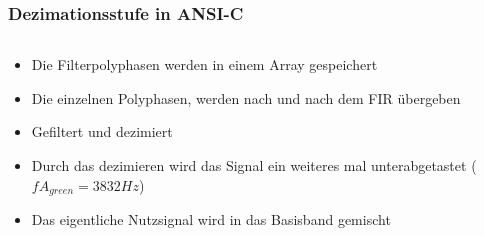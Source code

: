 \documentclass{beamer}
\begin{document}

\begin{frame}[fragile]
  \frametitle{Dezimationsstufe in ANSI-C}
  \begin{columns}
    \begin{column}{0.7\textwidth}
      \begin{itemize}
        \item Die Filterpolyphasen werden in einem Array gespeichert
        \item Die einzelnen Polyphasen, werden nach und nach dem FIR übergeben
        \item Gefiltert und dezimiert
        \item Durch das dezimieren wird das Signal ein weiteres mal unterabgetastet ($fA_{green} = 3832Hz$)
        \item Das eigentliche Nutzsignal wird in das Basisband gemischt
      \end{itemize}
    \end{column}
    \begin{column}{0.7\textwidth}

    \end{column}
  \end{columns}
  
\end{frame}
\end{document}
